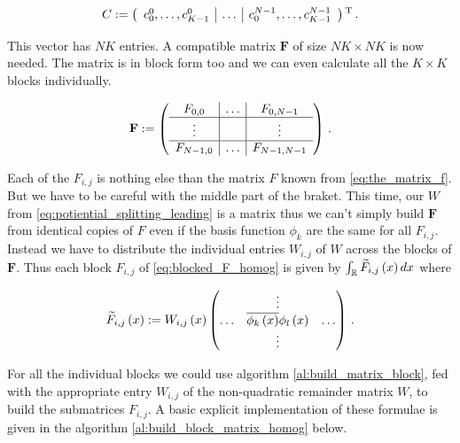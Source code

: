 \begin{equation} \label{eq:stack_coefficient_vectors_homog}
  C :=
  \left(
  \begin{array}{c|c|c}
    c_0^0, \hdots, c_{K-1}^0 & \hdots & c_0^{N-1}, \hdots, c_{K-1}^{N-1}
  \end{array}
  \right){}^{\textnormal{T}} \,.
\end{equation}

This vector has $N K$ entries. A compatible matrix $\mathbf{F}$ of size $N K \times N K$
is now needed. The matrix is in block form too and we can even calculate all the $K \times K$ blocks
individually.

\begin{equation} \label{eq:blocked_F_homog}
  \mathbf{F} :=
  \left(
  \begin{array}{c|c|c}
    F_{0,0}   & \hdots & F_{0,N-1} \\
    \hline
    \vdots    &        & \vdots \\
    \hline
    F_{N-1,0} & \hdots & F_{N-1,N-1} \\
  \end{array}
  \right) \,.
\end{equation}

Each of the $F_{i,j}$ is nothing else than the matrix $F$ known from \eqref{eq:the_matrix_f}.
But we have to be careful with the middle part of the braket. This time, our $W$ from \eqref{eq:potiential_splitting_leading}
is a matrix thus we can't simply build $\mathbf{F}$ from identical copies of $F$
even if the basis function $\phi_k$ are the same for all $F_{i,j}$. Instead we have to
distribute the individual entries $W_{i,j}$ of $W$ across the blocks of $\mathbf{F}$.
Thus each block $F_{i,j}$ of \eqref{eq:blocked_F_homog} is given by $\int_\mathbb{R} \widetilde{F}_{i,j}\left( x \right) dx$ where

\begin{equation}
  \widetilde{F}_{i,j}\left( x \right) := W_{i,j}\left( x \right)
  \begin{pmatrix}
     {}     & \vdots                             & {} \\
     \hdots & \overline{\phi_k\left( x \right)} \phi_l\left( x \right) & \hdots \\
     {}     & \vdots                             & {} \\
\end{pmatrix} \,.
\end{equation}

For all the individual blocks we could use algorithm \ref{al:build_matrix_block},
fed with the appropriate entry $W_{i,j}$ of the non-quadratic remainder matrix $W$,
to build the submatrices $F_{i,j}$. A basic explicit implementation of these formulae
is given in the algorithm \ref{al:build_block_matrix_homog} below.

